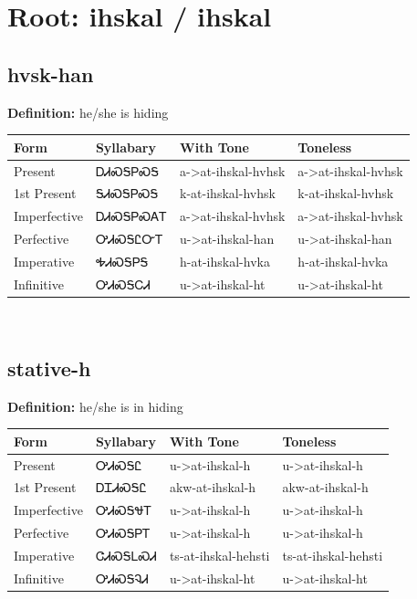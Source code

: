 \documentclass{article}%
\begin{document}
%
\normalsize%
\section*{Root: ihskal / ihskal}%
\subsection*{hvsk-han}%
\textbf{Definition: }%
he/she is hiding%
\\[0.5em]%
\begin{tabular}{|l|l|l|l|}%
\hline%
\textbf{Form}&\textbf{Syllabary}&\textbf{With Tone}&\textbf{Toneless}\\%
\hline%
Present&ᎠᏗᏍᎦᏢᏍᎦ&a{-}>at{-}ihskal{-}hvhsk&a{-}>at{-}ihskal{-}hvhsk\\%
1st Present&ᎦᏗᏍᎦᏢᏍᎦ&k{-}at{-}ihskal{-}hvhsk&k{-}at{-}ihskal{-}hvhsk\\%
Imperfective&ᎠᏗᏍᎦᏢᏍᎪᎢ&a{-}>at{-}ihskal{-}hvhsk&a{-}>at{-}ihskal{-}hvhsk\\%
Perfective&ᎤᏗᏍᎦᏝᏅᎢ&u{-}>at{-}ihskal{-}han&u{-}>at{-}ihskal{-}han\\%
Imperative&ᎭᏗᏍᎦᏢᎦ&h{-}at{-}ihskal{-}hvka&h{-}at{-}ihskal{-}hvka\\%
Infinitive&ᎤᏗᏍᎦᏟᏗ&u{-}>at{-}ihskal{-}ht&u{-}>at{-}ihskal{-}ht\\%
\hline%
\end{tabular}%
\\[1em]%
\subsection*{stative-h}%
\textbf{Definition: }%
he/she is in hiding%
\\[0.5em]%
\begin{tabular}{|l|l|l|l|}%
\hline%
\textbf{Form}&\textbf{Syllabary}&\textbf{With Tone}&\textbf{Toneless}\\%
\hline%
Present&ᎤᏗᏍᎦᏝ&u{-}>at{-}ihskal{-}h&u{-}>at{-}ihskal{-}h\\%
1st Present&ᎠᏆᏗᏍᎦᏝ&akw{-}at{-}ihskal{-}h&akw{-}at{-}ihskal{-}h\\%
Imperfective&ᎤᏗᏍᎦᏠᎢ&u{-}>at{-}ihskal{-}h&u{-}>at{-}ihskal{-}h\\%
Perfective&ᎤᏗᏍᎦᏢᎢ&u{-}>at{-}ihskal{-}h&u{-}>at{-}ihskal{-}h\\%
Imperative&ᏣᏗᏍᎦᏞᏍᏗ&ts{-}at{-}ihskal{-}hehsti&ts{-}at{-}ihskal{-}hehsti\\%
Infinitive&ᎤᏗᏍᎦᎸᏗ&u{-}>at{-}ihskal{-}ht&u{-}>at{-}ihskal{-}ht\\%
\hline%
\end{tabular}%
\\[1em]%
\end{document}

